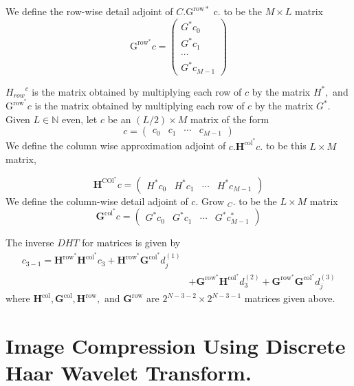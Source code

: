 We define the row-wise detail adjoint of $C . \mathrm{G}^{\mathrm{row} *}$ c. to be the $M \times L$ matrix
$$
\mathrm{G}^{\mathrm{row}^{*}} c=\left(\begin{array}{c}{G^{*} c_{0}} \\ {G^{*} c_{1}} \\ {\cdots} \\ {G^{*} c_{M-1}}\end{array}\right)
$$

${H_{row}}^{c}$ is the matrix obtained by multiplying each row of $c$ by the matrix
$H^{*},$ and $\mathrm{G}^{\mathrm{row}^{*}} c$ is the matrix obtained by multiplying each row of $c$ by the matrix $G^{*}$. Given $L \in \mathbb{N}$ even, let $c$ be an $(L / 2) \times M$ matrix of the form
$$
c=\left(\begin{array}{cccc}{c_{0}} & {c_{1}} & {\cdots} & {c_{M-1}}\end{array}\right)
$$
We define the column wise approximation adjoint of $c . \mathbf{H}^{\mathrm{col}^{*}} c .$ to be this $L \times M$ matrix,

$$
\mathbf{H}^{\mathrm{COl}^{*}} c=\left(\begin{array}{cccc}{H^{*} c_{0}} & {H^{*} c_{1}} & {\cdots} & {H^{*} c_{M-1}}\end{array}\right)
$$
We define the column-wise detail adjoint of $c .$ Grow $_{C} .$ to be the $L \times M$
matrix
$$
\mathbf{G}^{\mathrm{col}^{*}} c=\left(\begin{array}{cccc}{G^{*} c_{0}} & {G^{*} c_{1}} & {\cdots} & {G^{*} c_{M-1}^{*}}\end{array}\right)
$$

The inverse $D H T$ for matrices is given by
$$
\begin{aligned} c_{3-1}=\mathbf{H}^{\mathrm{row}^{*}} \mathbf{H}^{\mathrm{col}^{*}} c_{3}+\mathbf{H}^{\mathrm{row}^{*}} \mathbf{G}^{\mathrm{col}^{*}} d_{j}^{(1)} \\ &+\mathbf{G}^{\mathrm{row}^{*}} \mathbf{H}^{\mathrm{col}^{*}} d_{3}^{(2)}+\mathbf{G}^{\mathrm{row}^{*}} \mathbf{G}^{\mathrm{col}^{*}} d_{j}^{(3)} \end{aligned}
$$
where $\mathbf{H}^{\mathrm{col}}, \mathbf{G}^{\mathrm{col}}, \mathbf{H}^{\mathrm{row}},$ and $\mathbf{G}^{\mathrm{row}}$ are $2^{N-3-2} \times 2^{N-3-1}$ matrices given above.


\section{Image Compression Using Discrete Haar Wavelet Transform.}
\label{sec6}

